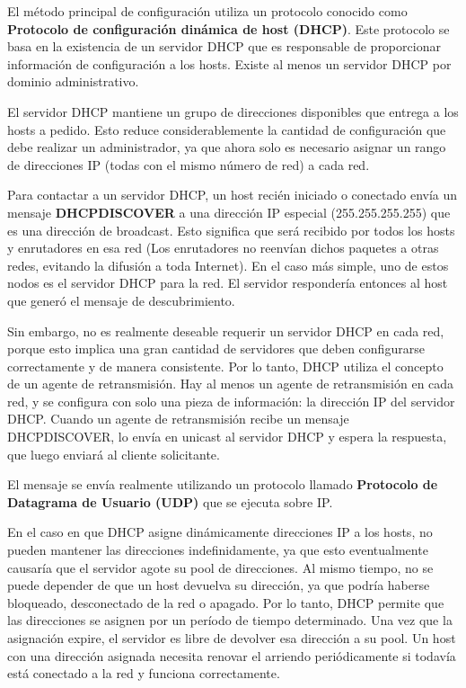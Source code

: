 El método principal de configuración utiliza un protocolo conocido como \textbf{Protocolo de configuración dinámica de host (DHCP)}. Este protocolo se basa en la existencia de un servidor DHCP que es responsable de proporcionar información de configuración a los hosts. Existe al menos un servidor DHCP por dominio administrativo.

El servidor DHCP mantiene un grupo de direcciones disponibles que entrega a los hosts a pedido. Esto reduce considerablemente la cantidad de configuración que debe realizar un administrador, ya que ahora solo es necesario asignar un rango de direcciones IP (todas con el mismo número de red) a cada red.

Para contactar a un servidor DHCP, un host recién iniciado o conectado envía un mensaje \textbf{DHCPDISCOVER} a una dirección IP especial (255.255.255.255) que es una dirección de broadcast. Esto significa que será recibido por todos los hosts y enrutadores en esa red (Los enrutadores no reenvían dichos paquetes a otras redes, evitando la difusión a toda Internet). En el caso más simple, uno de estos nodos es el servidor DHCP para la red. El servidor respondería entonces al host que generó el mensaje de descubrimiento.

Sin embargo, no es realmente deseable requerir un servidor DHCP en cada red, porque esto implica una gran cantidad de servidores que deben configurarse correctamente y de manera consistente. Por lo tanto, DHCP utiliza el concepto de un agente de retransmisión. Hay al menos un agente de retransmisión en cada red, y se configura con solo una pieza de información: la dirección IP del servidor DHCP. Cuando un agente de retransmisión recibe un mensaje DHCPDISCOVER, lo envía en unicast al servidor DHCP y espera la respuesta, que luego enviará al cliente solicitante.

El mensaje se envía realmente utilizando un protocolo llamado \textbf{Protocolo de Datagrama de Usuario (UDP)} que se ejecuta sobre IP.

En el caso en que DHCP asigne dinámicamente direcciones IP a los hosts, no pueden mantener las direcciones indefinidamente, ya que esto eventualmente causaría que el servidor agote su pool de direcciones. Al mismo tiempo, no se puede depender de que un host devuelva su dirección, ya que podría haberse bloqueado, desconectado de la red o apagado. Por lo tanto, DHCP permite que las direcciones se asignen por un período de tiempo determinado. Una vez que la asignación expire, el servidor es libre de devolver esa dirección a su pool. Un host con una dirección asignada necesita renovar el arriendo periódicamente si todavía está conectado a la red y funciona correctamente.

